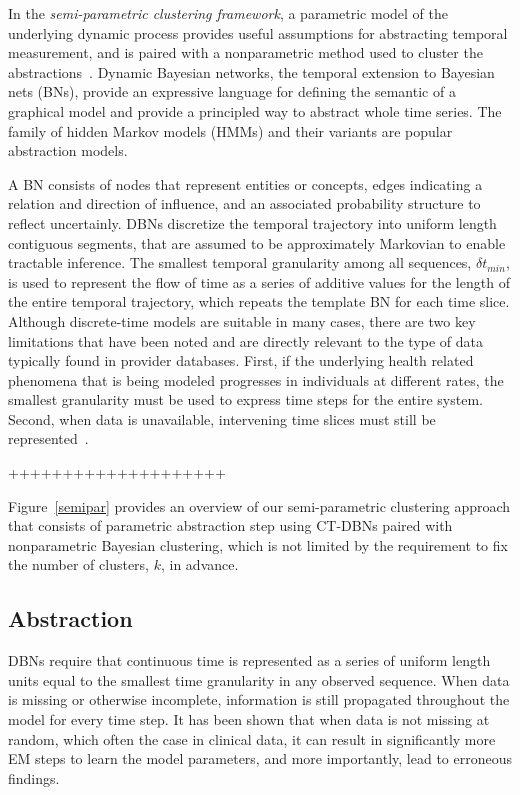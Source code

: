 In the \emph{semi-parametric clustering framework}, a parametric model of the underlying dynamic process provides useful assumptions for abstracting temporal measurement, and is paired with a nonparametric method used to cluster the abstractions~\cite{JebSonTha07a}.  Dynamic Bayesian networks, the temporal extension to Bayesian nets (BNs), provide an expressive language for defining the semantic of a graphical model and provide a principled way to abstract whole time series.  The family of hidden Markov models (HMMs) and their variants are popular abstraction models.

A BN consists of nodes that represent entities or concepts, edges indicating a relation and direction of influence, and an associated probability structure to reflect uncertainly.  DBNs discretize the temporal trajectory into uniform length contiguous segments, that are assumed to be approximately Markovian to enable tractable inference.  The smallest temporal granularity among all sequences, $\delta t_{min}$, is used to represent the flow of time as a series of additive values for the length of the entire temporal trajectory, which repeats the template BN for each time slice.
Although discrete-time models are suitable in many cases, there are two key limitations that have been noted and are directly relevant to the type of data typically found in provider databases. First, if the underlying health related phenomena that is being modeled progresses in individuals at different rates, the smallest granularity must be used to express time steps for the entire system. Second, when data is unavailable, intervening time slices must still be represented~\cite{Nodelman02,SariaNK07}.





++++++++++++++++++++




Figure~\ref{semipar} provides an overview of our semi-parametric clustering approach that consists of parametric abstraction step using CT-DBNs paired with nonparametric Bayesian clustering, which is not limited by the requirement to fix the number of clusters, $k$, in advance.

\subsection{Abstraction}
DBNs require that continuous time is represented as a series of uniform  length units equal to the smallest time granularity in any observed sequence. When data is missing or otherwise incomplete, information is still propagated throughout the
model for every time step. It has been shown that when data is not missing at random,
which often the case in clinical data, it can result in significantly more EM steps to learn
the model parameters, and more importantly, lead to erroneous findings.

